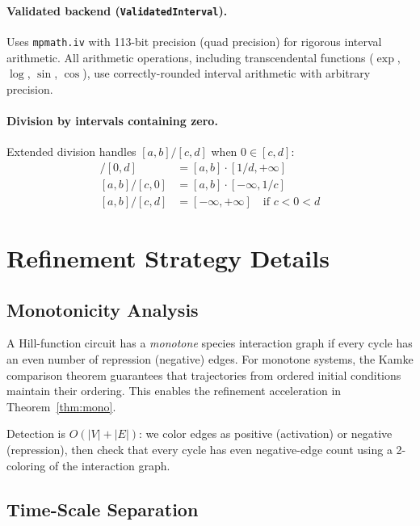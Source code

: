 \documentclass[11pt]{article}
\begin{document}
\paragraph{Validated backend (\texttt{ValidatedInterval}).}
Uses \texttt{mpmath.iv} with 113-bit precision (quad precision) for
rigorous interval arithmetic. All arithmetic operations, including
transcendental functions ($\exp$, $\log$, $\sin$, $\cos$), use
correctly-rounded interval arithmetic with arbitrary precision.

\paragraph{Division by intervals containing zero.}
Extended division handles $[a,b]/[c,d]$ when $0 \in [c,d]$:
\begin{align}
[a,b] / [0, d] &= [a,b] \cdot [1/d, +\infty] \\
[a,b] / [c, 0] &= [a,b] \cdot [-\infty, 1/c] \\
[a,b] / [c, d] &= [-\infty, +\infty] \quad\text{if } c < 0 < d
\end{align}

\section{Refinement Strategy Details}
\label{app:refinement}

\subsection{Monotonicity Analysis}

A Hill-function circuit has a \emph{monotone} species interaction
graph if every cycle has an even number of repression (negative)
edges. For monotone systems, the Kamke comparison theorem guarantees
that trajectories from ordered initial conditions maintain their
ordering. This enables the refinement acceleration in
Theorem~\ref{thm:mono}.

Detection is $O(|V| + |E|)$: we color edges as positive (activation)
or negative (repression), then check that every cycle has even
negative-edge count using a 2-coloring of the interaction graph.

\subsection{Time-Scale Separation}
\end{document}
